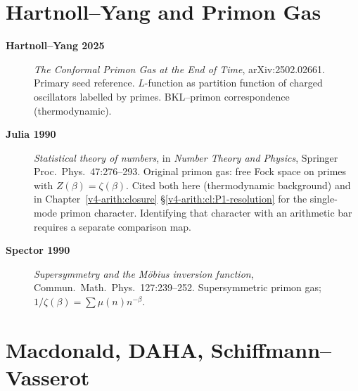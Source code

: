 \section{Hartnoll--Yang and Primon Gas}
\label{v4-arith:app:A:primon-gas}

\begin{description}
\item[\textbf{Hartnoll--Yang 2025}] \emph{The Conformal Primon Gas
at the End of Time}, arXiv:2502.02661. Primary seed reference.
\(L\)-function as partition function of charged oscillators
labelled by primes. BKL--primon correspondence (thermodynamic).
\item[\textbf{Julia 1990}] \emph{Statistical theory of numbers}, in
\emph{Number Theory and Physics}, Springer Proc.~Phys.~47:276--293.
Original primon gas: free Fock space on primes with
\(Z(\beta)=\zeta(\beta)\). Cited both here (thermodynamic background)
and in Chapter~\ref{v4-arith:closure}
\S\ref{v4-arith:cl:P1-resolution} for the single-mode primon
character. Identifying that character with an arithmetic bar
requires a separate comparison map.
\item[\textbf{Spector 1990}] \emph{Supersymmetry and the M\"obius
inversion function}, Commun.~Math.~Phys.~127:239--252.
Supersymmetric primon gas; \(1/\zeta(\beta)=\sum\mu(n)n^{-\beta}\).
\end{description}

\section{Macdonald, DAHA, Schiffmann--Vasserot}
\label{v4-arith:app:A:macdonald}

